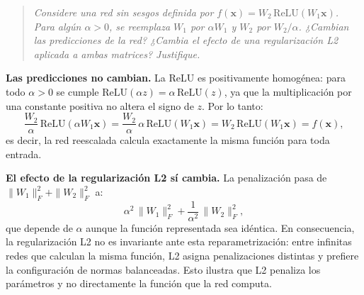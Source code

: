 \documentclass[12pt, a4paper]{article}
\newenvironment{enunciado}
  {\begin{quote}\itshape\color{black!75}}
  {\end{quote}}
\begin{document}
\begin{enunciado}
Considere una red sin sesgos definida por $f(\mathbf{x}) = W_2\,\mathrm{ReLU}(W_1\mathbf{x})$.
Para algún $\alpha > 0$, se reemplaza $W_1$ por $\alpha W_1$ y $W_2$ por $W_2/\alpha$.
¿Cambian las predicciones de la red? ¿Cambia el efecto de una regularización L2 aplicada a
ambas matrices? Justifique.
\end{enunciado}

\textbf{Las predicciones no cambian.} La ReLU es positivamente homogénea: para todo
$\alpha > 0$ se cumple $\mathrm{ReLU}(\alpha z) = \alpha\,\mathrm{ReLU}(z)$, ya que la
multiplicación por una constante positiva no altera el signo de $z$. Por lo tanto:
\begin{equation}
\frac{W_2}{\alpha}\,\mathrm{ReLU}(\alpha W_1 \mathbf{x})
= \frac{W_2}{\alpha}\,\alpha\,\mathrm{ReLU}(W_1 \mathbf{x})
= W_2\,\mathrm{ReLU}(W_1 \mathbf{x}) = f(\mathbf{x}),
\end{equation}
es decir, la red reescalada calcula exactamente la misma función para toda entrada.

\textbf{El efecto de la regularización L2 sí cambia.} La penalización pasa de
$\|W_1\|_F^2 + \|W_2\|_F^2$ a:
\begin{equation}
\alpha^2\,\|W_1\|_F^2 + \frac{1}{\alpha^2}\,\|W_2\|_F^2,
\end{equation}
que depende de $\alpha$ aunque la función representada sea idéntica. En consecuencia, la
regularización L2 no es invariante ante esta reparametrización: entre infinitas redes que
calculan la misma función, L2 asigna penalizaciones distintas y prefiere la configuración
de normas balanceadas. Esto ilustra que L2 penaliza los parámetros y no directamente la
función que la red computa.
\end{document}
